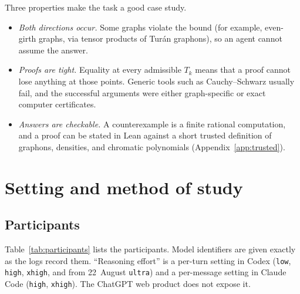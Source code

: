 \documentclass[11pt,a4paper]{article}
\newcommand{\ttt}[1]{\texttt{#1}}
\begin{document}
Three properties make the task a good case study.
\begin{itemize}
\item \emph{Both directions occur.} Some graphs violate the bound (for example, even-girth graphs, via tensor
  products of Tur\'an graphons), so an agent cannot assume the answer.
\item \emph{Proofs are tight.} Equality at every admissible $T_k$ means that a proof cannot lose anything at
  those points. Generic tools such as Cauchy--Schwarz usually fail, and the successful arguments were either
  graph-specific or exact computer certificates.
\item \emph{Answers are checkable.} A counterexample is a finite rational computation, and a proof can be
  stated in Lean against a short trusted definition of graphons, densities, and chromatic polynomials
  (Appendix~\ref{app:trusted}).
\end{itemize}

\section{Setting and method of study}\label{sec:method}

\subsection{Participants}

Table~\ref{tab:participants} lists the participants. Model identifiers are given exactly as the logs record
them. ``Reasoning effort'' is a per-turn setting in Codex (\ttt{low}, \ttt{high}, \ttt{xhigh}, and from
22~August \ttt{ultra}) and a per-message setting in Claude Code (\ttt{high}, \ttt{xhigh}). The ChatGPT web
product does not expose it.
\end{document}
